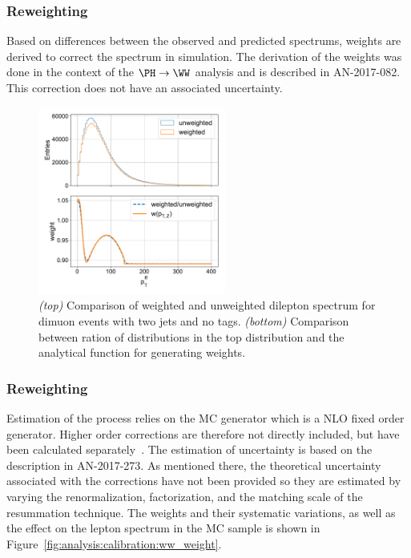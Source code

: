\subsubsection{\PZ \pt  Reweighting}
Based on differences between the observed and predicted \PZ \pt spectrums, weights are derived to correct the \pt spectrum in simulation. The derivation of the weights was done in the context of the $\PH \rightarrow \WW $ analysis and is described in AN-2017-082. This correction does not have an associated uncertainty.
\begin{figure}[ht]
    \centering
    \includegraphics[width=0.55\textwidth]{chapters/Analysis/sectionCalibration/figures/generator/z_pt_weighting}
    \caption{\emph{(top)} Comparison of weighted and unweighted dilepton \pt spectrum for dimuon events with two jets and no \PQb tags. \emph{(bottom)} Comparison between ration of distributions in the top distribution and the analytical function for generating weights.}
    \label{fig:analysis:calibration:z_weight}
\end{figure}


\subsubsection{\WW \pt  Reweighting}
Estimation of the \WW process relies on the \POWHEG MC generator which is a NLO fixed order generator. Higher order corrections are therefore not directly included, but have been calculated separately~\cite{Meade:2014fca, Jaiswal:2014yba, Grazzini:2015wpa}.  The estimation of uncertainty is based on the description in AN-2017-273. As mentioned there, the theoretical uncertainty associated with the corrections have not been provided so they are estimated by varying the renormalization, factorization, and the matching scale of the \pt resummation technique. The weights and their systematic variations, as well as the effect on the lepton \pt spectrum in the \WW MC sample is shown in Figure~\ref{fig:analysis:calibration:ww_weight}.

